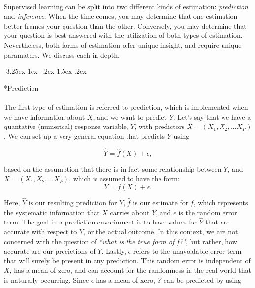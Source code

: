 \documentclass[titlepage, 12pt, twoside]{book}
\makeatletter
\renewcommand\subsubsection{\@startsection{subsubsection}{3}{\z@}%
	{-3.25ex\@plus -1ex \@minus -.2ex}%
	{1.5ex \@plus .2ex}%
	{\normalfont\normalsize\bfseries\raggedright}}
\makeatother
\begin{document}
\color{black} \paragraph{} Supervised learning can be split into two different kinds of estimation: \textit{prediction} and \textit{inference}. When the time comes, you may determine that one estimation better frames your question than the other. Conversely, you may determine that your question is best answered with the utilization of both types of estimation. Nevertheless, both forms of estimation offer unique insight, and require unique paramaters. We discuss each in depth. 

\color{astral} \subsubsection*{Prediction}

\color{black} \paragraph{} The first type of estimation is referred to prediction, which is implemented when we have information about $X$, and we want to predict $Y$. Let's say that we have a quantative (numerical) response variable, $Y$, with predictors $X = (X_1, X_2, ... X_P)$. We can set up a very general equation that predicts $Y$ using

\begin{equation}
	\hat{Y} = \hat{f}(X) + \epsilon,
\end{equation} 

based on the assumption that there is in fact some relationship between $Y$, and 
$X = (X_1, X_2, ... X_P)$, which is assumed to have the form:
\begin{equation}
	Y = f (X) + \epsilon.
\end{equation} 
 
 Here, $\hat{Y}$ is our resulting prediction for $Y$, $\hat{f}$ is our estimate for $f$, which represents the systematic information that $X$ carries about $Y$, and $\epsilon$ is the random error term. The goal in a prediction envorinment is to have values for $\hat{Y}$ that are accurate with respect to $Y$, or the actual outcome. In this context, we are not concerned with the question of \textit{``what is the true form of f?"}, but rather, how accurate are our precictions of $Y$. Lastly, $\epsilon$ refers to the unavoidable error term that will surely be present in any prediction. This random error is independent of $X$, has a mean of zero, and can account for the randomness in the real-world that is naturally occurring. Since $\epsilon$ has a mean of xero, $Y$ can be predicted by using 
 
\end{document}
